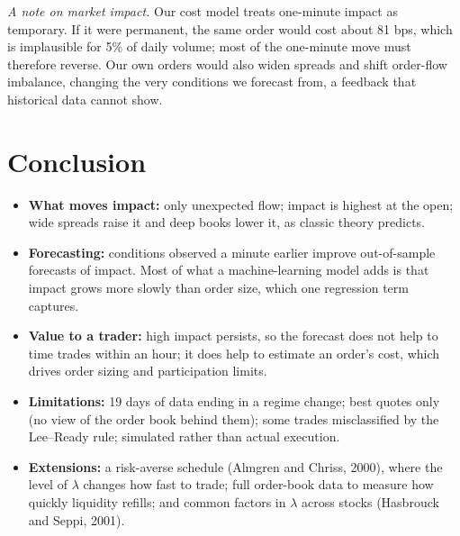 \documentclass[10pt,letterpaper]{article}
\begin{document}
\textit{A note on market impact.} Our cost model treats one-minute impact as temporary. If it were permanent, the same order would cost about 81 bps, which is implausible for 5\% of daily volume; most of the one-minute move must therefore reverse. Our own orders would also widen spreads and shift order-flow imbalance, changing the very conditions we forecast from, a feedback that historical data cannot show.

\section{Conclusion}
\begin{itemize}
\item \textbf{What moves impact:} only unexpected flow; impact is highest at the open; wide spreads raise it and deep books lower it, as classic theory predicts.
\item \textbf{Forecasting:} conditions observed a minute earlier improve out-of-sample forecasts of impact. Most of what a machine-learning model adds is that impact grows more slowly than order size, which one regression term captures.
\item \textbf{Value to a trader:} high impact persists, so the forecast does not help to time trades within an hour; it does help to estimate an order's cost, which drives order sizing and participation limits.
\item \textbf{Limitations:} 19 days of data ending in a regime change; best quotes only (no view of the order book behind them); some trades misclassified by the Lee--Ready rule; simulated rather than actual execution.
\item \textbf{Extensions:} a risk-averse schedule (Almgren and Chriss, 2000), where the level of $\lambda$ changes how fast to trade; full order-book data to measure how quickly liquidity refills; and common factors in $\lambda$ across stocks (Hasbrouck and Seppi, 2001).
\end{itemize}
\end{document}
